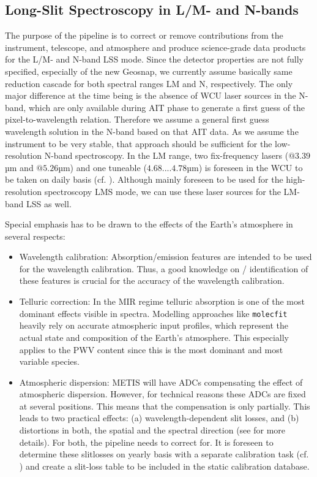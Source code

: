 \subsection{Long-Slit Spectroscopy in L/M- and N-bands}

The purpose of the pipeline is to correct or remove contributions from
the instrument, telescope, and atmosphere and produce science-grade
data products for the L/M- and N-band \ac{LSS}
mode. Since the detector properties are not fully specified, especially of the new Geosnap, we currently assume
basically same reduction cascade for both spectral ranges LM and
N, respectively. The only major difference at the time being is the absence of \ac{WCU} laser sources in the N-band, which are only available during \ac{AIT} phase to generate a first guess of the pixel-to-wavelength relation. Therefore we assume a general first guess wavelength solution in the N-band based on that \ac{AIT} data. As we assume the instrument to be very stable, that approach should be sufficient for the low-resolution N-band spectroscopy. In the LM range, two fix-frequency lasers ($@3.39$µm and $@5.26$µm) and one tuneable ($4.68....4.78$µm) is foreseen in the \ac{WCU} to be taken on daily basis (cf. \cite{METIS-calibration_plan}). Although mainly foreseen to be used for the high-resolution spectroscopy \ac{LMS} mode, we can use these laser sources for the LM-band \ac{LSS} as well.

Special emphasis has to be drawn to the effects of the Earth's
atmosphere in several respects:
\begin{itemize}
\item Wavelength calibration: Absorption/emission features are intended to be
  used for the wavelength calibration. Thus, a good knowledge on /
  identification of these features is crucial for the accuracy of the
  wavelength calibration.
\item Telluric correction: In the MIR regime telluric absorption is
  one of the most dominant effects visible in spectra. Modelling
  approaches like \texttt{molecfit} heavily rely on accurate
  atmospheric input profiles, which represent the actual state and
  composition of the Earth's atmosphere. This especially applies to
  the \ac{PWV} content since this is the most
  dominant and most variable species.
\item Atmospheric dispersion: \ac{METIS} will have \ac{ADC}s compensating the
  effect of atmospheric dispersion. However, for technical reasons
  these ADCs are fixed at several positions. This means that the
  compensation is only partially. This leads to two practical effects:
  (a) wavelength-dependent slit losses, and (b) distortions in both,
  the spatial and the spectral direction (see \cite{METIS-ADC_study}
  for more details). For both, the pipeline needs to correct
  for. It is foreseen to determine these slitlosses on yearly basis with a separate calibration task (cf. \cite{METIS-calibration_plan}) and create a slit-loss table to be included in the static calibration database.
\end{itemize}

